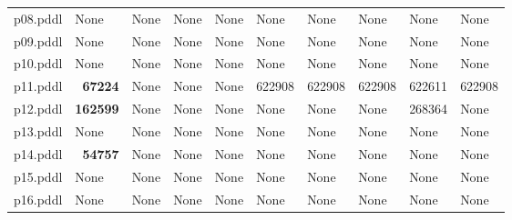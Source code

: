 \documentclass{article}
\begin{document}
\begin{tabular}{@{}lrrrrrrrrr@{}}
p08.pddl & \multicolumn{1}{|l|}{None} & \multicolumn{1}{|l|}{None} & \multicolumn{1}{|l|}{None} & \multicolumn{1}{|l|}{None} & \multicolumn{1}{|l|}{None} & \multicolumn{1}{|l|}{None} & \multicolumn{1}{|l|}{None} & \multicolumn{1}{|l|}{None} & \multicolumn{1}{|l|}{None} \\
p09.pddl & \multicolumn{1}{|l|}{None} & \multicolumn{1}{|l|}{None} & \multicolumn{1}{|l|}{None} & \multicolumn{1}{|l|}{None} & \multicolumn{1}{|l|}{None} & \multicolumn{1}{|l|}{None} & \multicolumn{1}{|l|}{None} & \multicolumn{1}{|l|}{None} & \multicolumn{1}{|l|}{None} \\
p10.pddl & \multicolumn{1}{|l|}{None} & \multicolumn{1}{|l|}{None} & \multicolumn{1}{|l|}{None} & \multicolumn{1}{|l|}{None} & \multicolumn{1}{|l|}{None} & \multicolumn{1}{|l|}{None} & \multicolumn{1}{|l|}{None} & \multicolumn{1}{|l|}{None} & \multicolumn{1}{|l|}{None} \\
p11.pddl & \textbf{67224} & \multicolumn{1}{|l|}{None} & \multicolumn{1}{|l|}{None} & \multicolumn{1}{|l|}{None} & 622908 & 622908 & 622908 & 622611 & 622908 \\
p12.pddl & \textbf{162599} & \multicolumn{1}{|l|}{None} & \multicolumn{1}{|l|}{None} & \multicolumn{1}{|l|}{None} & \multicolumn{1}{|l|}{None} & \multicolumn{1}{|l|}{None} & \multicolumn{1}{|l|}{None} & 268364 & \multicolumn{1}{|l|}{None} \\
p13.pddl & \multicolumn{1}{|l|}{None} & \multicolumn{1}{|l|}{None} & \multicolumn{1}{|l|}{None} & \multicolumn{1}{|l|}{None} & \multicolumn{1}{|l|}{None} & \multicolumn{1}{|l|}{None} & \multicolumn{1}{|l|}{None} & \multicolumn{1}{|l|}{None} & \multicolumn{1}{|l|}{None} \\
p14.pddl & \textbf{54757} & \multicolumn{1}{|l|}{None} & \multicolumn{1}{|l|}{None} & \multicolumn{1}{|l|}{None} & \multicolumn{1}{|l|}{None} & \multicolumn{1}{|l|}{None} & \multicolumn{1}{|l|}{None} & \multicolumn{1}{|l|}{None} & \multicolumn{1}{|l|}{None} \\
p15.pddl & \multicolumn{1}{|l|}{None} & \multicolumn{1}{|l|}{None} & \multicolumn{1}{|l|}{None} & \multicolumn{1}{|l|}{None} & \multicolumn{1}{|l|}{None} & \multicolumn{1}{|l|}{None} & \multicolumn{1}{|l|}{None} & \multicolumn{1}{|l|}{None} & \multicolumn{1}{|l|}{None} \\
p16.pddl & \multicolumn{1}{|l|}{None} & \multicolumn{1}{|l|}{None} & \multicolumn{1}{|l|}{None} & \multicolumn{1}{|l|}{None} & \multicolumn{1}{|l|}{None} & \multicolumn{1}{|l|}{None} & \multicolumn{1}{|l|}{None} & \multicolumn{1}{|l|}{None} & \multicolumn{1}{|l|}{None} \\

\end{tabular}
\end{document}
